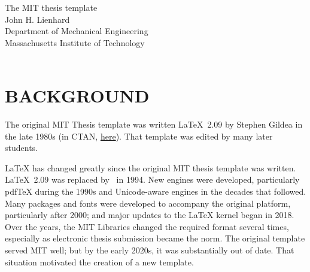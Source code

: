\documentclass[11pt]{article}
\makeatletter
\newcommand{\daymonthyeardate}{%
  \DTMenglishordinal{\@dtm@day}\space\DTMenglishmonthname{\@dtm@month} \@dtm@year
}
\renewcommand\abstractname{SUMMARY}
\makeatother
\begin{document}
\begingroup  
  \centering
  \LARGE The MIT thesis template\\[1em]
  \large 
  John H. Lienhard \\ Department of Mechanical Engineering \\ Massachusetts Institute of Technology
  \\[1em]
  \daymonthyeardate\\[1em]
\endgroup


\pdfbookmark[1]{\abstractname}{summary}
\begin{abstract}
This \LaTeX\ class formats theses according to the requirements of the MIT Libraries. The template is suitable for MIT theses of all types and at all levels. The title and abstract pages are automatically laid out from information provided by the user. The template includes options to use a variety of typefaces, and it is compatible with either pdfTeX or unicode engines such as LuaLaTeX. When using LaTeX formats dated November 2022 or later, the resulting pdf file meets the PDF/A-2b archivability standard. A standard \href{https://www.tug.org/texlive/}{\TeX\ Live} installation includes all other packages required by the template.  This document provides instructions for installation and use of the template.
\end{abstract}

\tableofcontents

\section{BACKGROUND}

The original MIT Thesis template was written \LaTeX\ 2.09 by Stephen Gildea in the late 1980s (in CTAN, \href{https://mirrors.ctan.org/obsolete/macros/latex209/contrib/mitthesis/mitthesis.sty}{here}). That template was edited by many later students.

LaTeX has changed greatly since the original MIT thesis template was written. \LaTeX\ 2.09 was replaced by \LaTeXe\ in 1994. New engines were developed, particularly pdfTeX during the 1990s and Unicode-aware engines in the decades that followed. Many packages and fonts were developed to accompany the original platform, particularly after 2000; and major updates to the LaTeX kernel began in 2018. Over the years, the MIT Libraries changed the required format several times, especially as electronic thesis submission became the norm. The original template served MIT well; but by the early 2020s, it was substantially out of date. That situation motivated the creation of a new template. 
\end{document}
